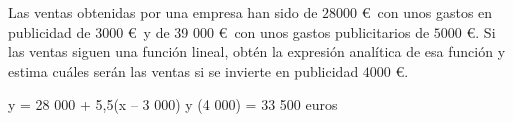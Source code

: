 \documentclass[addpoints,spanish, 12pt,a4paper]{exam}
\begin{document}
\begin{questions}

\question[2] Las ventas obtenidas por una empresa han sido de $28000$ \euro \ con unos gastos
en publicidad de $3000$ \euro \ y de 39 000 \euro \ con unos gastos publicitarios de
$5 000$ \euro.
Si las ventas siguen una función lineal, obtén la expresión analítica de esa función y estima cuáles serán las ventas si se invierte en publicidad $4 000$ \euro.
\begin{solution}
    y = 28 000 + 5,5(x – 3 000)
y (4 000) = 33 500 euros
\end{solution}



\end{questions}
\end{document}
